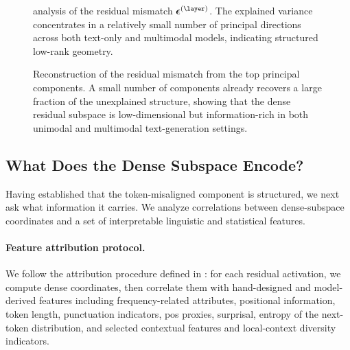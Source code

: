 \documentclass{article}
\begin{document}
\begin{figure}[t]
  \centering
  \caption{
     analysis of the residual mismatch $\boldsymbol{\epsilon}^{(\layer)}$.
    The explained variance concentrates in a relatively small number of principal directions across both text-only and multimodal models, indicating structured low-rank geometry.
  }
  \label{fig:residual_pca}
\end{figure}

\begin{figure}[t]
  \centering
  \caption{
    Reconstruction of the residual mismatch from the top principal components.
    A small number of components already recovers a large fraction of the unexplained structure, showing that the dense residual subspace is low-dimensional but information-rich in both unimodal and multimodal text-generation settings.
  }
  \label{fig:residual_pca_recon}
\end{figure}

\subsection{What Does the Dense Subspace Encode?}
\label{subsec:dense_subspace}

Having established that the token-misaligned component is structured, we next ask what information it carries.
We analyze correlations between dense-subspace coordinates and a set of interpretable linguistic and statistical features.

\paragraph{Feature attribution protocol.}
We follow the attribution procedure defined in : for each residual activation, we compute dense coordinates, then correlate them with hand-designed and model-derived features including
frequency-related attributes, positional information, token length, punctuation indicators, \gls{pos} proxies, surprisal, entropy of the next-token distribution, and selected contextual features and local-context diversity indicators.
\end{document}
